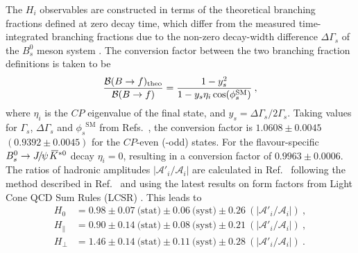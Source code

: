 \documentclass[12pt,a4paper]{article}
\newcommand{\CP}{\ensuremath{{C\!P}}\xspace}
\def\PJ      {\ensuremath{J}\xspace}
\def\CP                {\ensuremath{C\!P}\xspace}
\def\Ppsi {\ensuremath{\psi}\xspace}
\def\jpsi     {{\ensuremath{{\PJ\mskip -3mu/\mskip -2mu\Ppsi\mskip 2mu}}}\xspace}
\newcommand{\Bs}{\ensuremath{B^0_s}\xspace}
\newcommand{\BsJpsiKst}{\ensuremath{B^0_s\to \jpsi \Kstarzb}\xspace}
\newcommand{\phis}{\ensuremath{\phi_s}\xspace}
\def\Kbar  {\kern 0.2em\overline{\kern -0.2em K}{}\xspace}
\def\Kstarzb {\ensuremath{\Kbar^{*0}}\xspace}
\newcommand{\BRof}[1]{\ensuremath{{\cal B}(#1)}\xspace}
\newcommand{\BR}{\BRof}
\begin{document}
The $H_i$ observables are constructed in terms of the theoretical branching fractions defined at zero decay time, which differ from the measured time-integrated branching fractions \cite{Kristof} due to the non-zero decay-width difference $\Delta\Gamma_s$ of the \Bs meson system \cite{HFAG}.
The conversion factor between the two branching fraction definitions \cite{Kristof} is taken to be
\begin{equation}
\frac{\BR{B\to f}_{\text{theo}}}{\BR{B\to f}}
= \frac{1-y_s^2}{1-y_s \eta_i \cos(\phis^{\text{SM}})}\:,
\end{equation}
where $\eta_i$ is the \CP eigenvalue of the final state, and $y_s = \Delta\Gamma_s/2\Gamma_s$. 
Taking values for $\Gamma_s$, $\Delta\Gamma_s$ and $\phis^{\text{SM}}$ from Refs.~\cite{HFAG, Charles:2015gya}, the conversion factor is $1.0608 \pm 0.0045$ $(0.9392 \pm 0.0045)$ for the \CP-even (-odd) states.
For the flavour-specific $\BsJpsiKst$ decay $\eta_i = 0$, resulting in a conversion factor of $0.9963 \pm 0.0006$.
The ratios of hadronic amplitudes $|\mathcal{A}'_i/\mathcal{A}_i|$ are calculated in Ref.~\cite{ThesisKDeBruyn} following the method described in Ref.~\cite{Dighe:1998vk} and using the latest results on form factors from Light Cone QCD Sum Rules (LCSR) \cite{Straub:2015ica}.
This leads to
\begin{align*}
H_0 & = 0.98 \pm 0.07\:\text{(stat)} \pm 0.06\:\text{(syst)} \pm 0.26\:(|\mathcal{A}'_i/\mathcal{A}_i|)\:,\\
H_\parallel & = 0.90 \pm 0.14\:\text{(stat)} \pm 0.08\:\text{(syst)} \pm 0.21\:(|\mathcal{A}'_i/\mathcal{A}_i|)\:,\\
H_\perp & = 1.46 \pm 0.14\:\text{(stat)} \pm 0.11\:\text{(syst)} \pm 0.28\:(|\mathcal{A}'_i/\mathcal{A}_i|)\:.
\end{align*}
\end{document}
